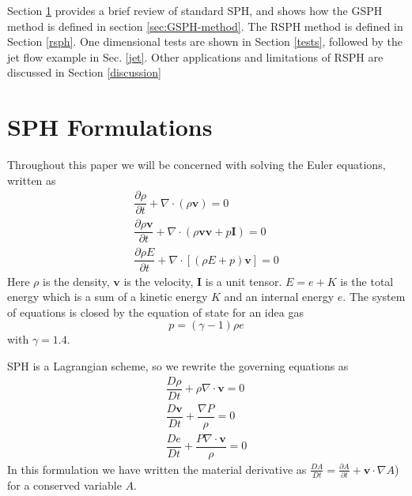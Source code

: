 \documentclass[review]{elsarticle}
\begin{document}
Section \ref{sph} provides a brief review of standard SPH, and shows how the
GSPH method is defined in section \ref{sec:GSPH-method}. The RSPH method is defined in Section \ref{rsph}.
One dimensional tests are shown in Section \ref{tests}, followed by the jet flow
example in Sec. \ref{jet}. 
Other applications and limitations  of RSPH are discussed in Section \ref{discussion}


\section{SPH Formulations} \label{sph}
Throughout this paper we will be concerned with solving the Euler equations, written as
\begin{align}
\dfrac{\partial \rho}{\partial t} + \nabla \cdot \left(\rho \textbf{v} \right) = 0 \label{eq:gov-cs-rho} \\
\dfrac{\partial \rho \textbf{v}}{\partial t} + \nabla \cdot \left(\rho \textbf{v} \textbf{v} + p\textbf{I}\right) = 0 \label{eq:gov-cs-v} \\
\dfrac{\partial \rho E}{\partial t} + \nabla \cdot \left[\left(\rho E + p \right)\textbf{v}\right] = 0 \label{eq:gov-cs-e}
\end{align}
Here $\rho$ is the density, $\textbf{v}$ is the velocity, $\textbf{I}$ is a unit tensor.
$E = e + K $ is the total energy which is a sum of a 
kinetic energy $K$ and an internal energy $e$.
The system of equations is closed by the equation of state  for an idea gas
\begin{equation}
p = \left(\gamma - 1\right)\rho e \label{eq:EOS}
\end{equation}
with $\gamma=1.4$.

SPH is a Lagrangian scheme, so we rewrite the governing equations  as
\begin{align}   %
\dfrac{D \rho}{D t} + \rho \nabla \cdot \textbf{v} = 0 \label{eq:gov-nc-rho}\\
\dfrac{D \textbf{v}}{D t} + \dfrac{\nabla P}{\rho} =0 \label{eq:gov-nc-v}\\
\dfrac{D e}{D t} + \dfrac{P \nabla \cdot \textbf{v}}{\rho} = 0 \label{eq:gov-nc-e}
\end{align}
In this formulation we have written the material derivative  as 
$\frac{D A}{Dt} = \frac{\partial A}{\partial t} + \textbf{v} \cdot \nabla A$) for a conserved variable $A$.

\end{document}
